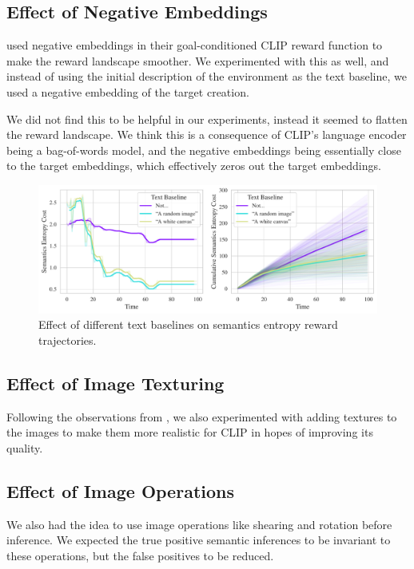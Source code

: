 \subsection{Effect of Negative Embeddings}
\label{sec:negative-embeddings}
\cite{negprompt} used negative embeddings in their goal-conditioned CLIP reward function to make the reward landscape smoother.
We experimented with this as well, and instead of using the initial description of the environment as the text baseline, we used a negative embedding of the target creation.

We did not find this to be helpful in our experiments, instead it seemed to flatten the reward landscape.
We think this is a consequence of CLIP's language encoder being a bag-of-words model, and the negative embeddings being essentially close to the target embeddings, which effectively zeros out the target embeddings.

\begin{figure}[H]
    \centering
    \includegraphics[width=\textwidth]{images/baseline_comparison.pdf}
    \caption{Effect of different text baselines on semantics entropy reward trajectories.}
    \label{fig:baseline}
\end{figure}

\subsection{Effect of Image Texturing}
\label{sec:image-texturing}
Following the observations from \cite{vlmrm}, we also experimented with adding textures to the images to make them more realistic for CLIP in hopes of improving its quality.


\subsection{Effect of Image Operations}
\label{sec:image-operations}
We also had the idea to use image operations like shearing and rotation before inference.
We expected the true positive semantic inferences to be invariant to these operations, but the false positives to be reduced.

